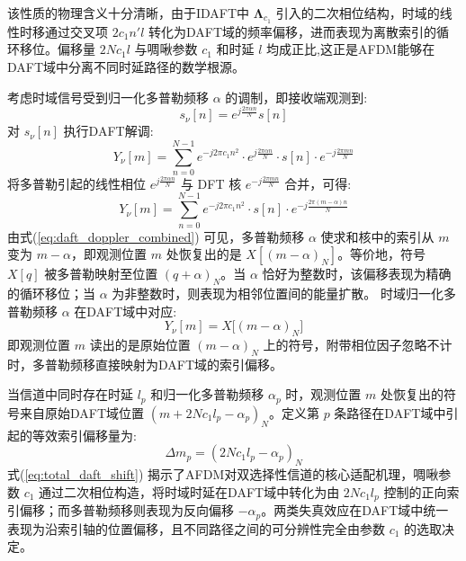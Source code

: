 该性质的物理含义十分清晰，由于IDAFT中 $\boldsymbol{\Lambda}_{c_1}$ 引入的二次相位结构，时域的线性时移通过交叉项 $2c_1 n' l$ 转化为DAFT域的频率偏移，进而表现为离散索引的循环移位。偏移量 $2Nc_1 l$ 与啁啾参数 $c_1$ 和时延 $l$ 均成正比,这正是AFDM能够在DAFT域中分离不同时延路径的数学根源。

考虑时域信号受到归一化多普勒频移 $\alpha$ 的调制，即接收端观测到:
\begin{equation}
    s_{\nu}[n] = e^{j\frac{2\pi \alpha n}{N}} s[n]
    \label{eq:freq_shift_signal}
\end{equation}
对 $s_{\nu}[n]$ 执行DAFT解调:
\begin{equation}
    Y_{\nu}[m] = \sum_{n=0}^{N-1} e^{-j2\pi c_1 n^2} \cdot e^{j\frac{2\pi \alpha n}{N}} \cdot s[n] \cdot e^{-j\frac{2\pi mn}{N}}
    \label{eq:daft_of_doppler}
\end{equation}
将多普勒引起的线性相位 $e^{j\frac{2\pi \alpha n}{N}}$ 与 DFT 核 $e^{-j\frac{2\pi mn}{N}}$ 合并，可得:
\begin{equation}
    Y_{\nu}[m] = \sum_{n=0}^{N-1} e^{-j2\pi c_1 n^2} \cdot s[n] \cdot e^{-j\frac{2\pi (m-\alpha) n}{N}}
    \label{eq:daft_doppler_combined}
\end{equation}
由式(\ref{eq:daft_doppler_combined}) 可见，多普勒频移 $\alpha$ 使求和核中的索引从 $m$ 变为 $m - \alpha$，即观测位置 $m$ 处恢复出的是 $X[(m-\alpha)_N]$。等价地，符号 $X[q]$ 被多普勒映射至位置 $(q+\alpha)_N$。当 $\alpha$ 恰好为整数时，该偏移表现为精确的循环移位；当 $\alpha$ 为非整数时，则表现为相邻位置间的能量扩散。
时域归一化多普勒频移 $\alpha$ 在DAFT域中对应:
\begin{equation}
    Y_{\nu}[m] = X\bigl[(m - \alpha)_N\bigr]
    \label{eq:daft_freq_shift_property}
\end{equation}
即观测位置 $m$ 读出的是原始位置 $(m-\alpha)_N$ 上的符号，附带相位因子忽略不计时，多普勒频移直接映射为DAFT域的索引偏移。


当信道中同时存在时延 $l_p$ 和归一化多普勒频移 $\alpha_p$ 时，观测位置 $m$ 处恢复出的符号来自原始DAFT域位置 $(m + 2Nc_1 l_p - \alpha_p)_N$。定义第 $p$ 条路径在DAFT域中引起的等效索引偏移量为:                           
\begin{equation}
    \Delta m_p = (2Nc_1 l_p - \alpha_p)_N
    \label{eq:total_daft_shift}
\end{equation}
式(\ref{eq:total_daft_shift}) 揭示了AFDM对双选择性信道的核心适配机理，啁啾参数 $c_1$ 通过二次相位构造，将时域时延在DAFT域中转化为由 $2Nc_1 l_p$ 控制的正向索引偏移；而多普勒频移则表现为反向偏移 $-\alpha_p$。两类失真效应在DAFT域中统一表现为沿索引轴的位置偏移，且不同路径之间的可分辨性完全由参数 $c_1$ 的选取决定。

